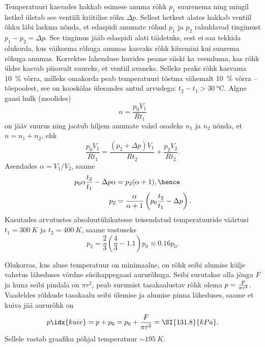 \documentclass[10pt]{article}
\begin{document}
{
\solu
Temperatuuri kasvades hakkab esimese anuma rõhk $p_1$ suurenema ning mingil hetkel ületab see ventiili kriitilise rõhu $\Delta p$. Sellest hetkest alates hakkab ventiil õhku läbi laskma nõnda, et edaspidi anumate rõhud $p_1$ ja $p_2$ rahuldavad tingimust $p_1 - p_2 = \Delta p$. See tingimus jääb edaspidi alati täidetuks, sest ei saa tekkida olukorda, kus väiksema rõhuga anumas kasvaks rõhk kiiremini kui suurema rõhuga anumas. Korrektse lahenduse huvides peame siiski ka veenduma, kas rõhk üldse kasvab piisavalt suureks, et ventiil avaneks. Selleks peaks rõhk kasvama \SI{10}{\%} võrra, milleks omakorda peab temperatuuri tõstma vähemalt \SI{10}{\%} võrra – tõepoolest, see on kooskõlas ülesandes antud arvudega: $t_2 - t_1 > \SI{30}{\degreeCelsius}$. Algne gaasi hulk (moolides)
\[
n=\frac{p_{0} V_{1}}{R t_{1}}
\]
on jääv suurus ning jaotub hiljem anumate vahel osadeks $n_1$ ja $n_2$ nõnda, et $n = n_1+ n_2$, ehk
\[
\frac{p_{0} V_{1}}{R t_{1}}=\frac{\left(p_{2}+\Delta p\right) V_{1}}{R t_{2}}+\frac{p_{2} V_{2}}{R t_{2}}.
\]
Asendades $\alpha = V_1/V_2$, saame
\begin{align*}
p_{0} \alpha \frac{t_{2}}{t_{1}}-\Delta p \alpha&=p_{2}(\alpha+1),\hence
\\
p_{2}&=\frac{\alpha}{\alpha+1}\left(p_{0} \frac{t_{2}}{t_{1}}-\Delta p\right).
\end{align*}
Kasutades arvutustes absoluutühikutesse teisendatud temperatuuride väärtusi $t_1= \SI{300}{K}$ ja $t_2= \SI{400}{K}$, saame vastuseks
\[
p_2=\frac 23 \left(\frac 43- \num{1,1}\right) p_0 \approx \num{0,16}p_0.
\]
\probend
\bigskip


\solu
Olukorras, kus aluse temperatuur on minimaalne, on rõhk seibi alumise külje vahetus läheduses võrdne
süsihappegaasi aururõhuga. Seibi surutakse alla jõuga $F$ ja kuna seibi
pindala on $\pi r^2$, peab surumist tasakaalustav rõhk olema $p={F\over \pi r^2}$.
Vaadeldes rõhkude tasakaalu seibi ülemise ja alumise pinna läheduses, saame et kuiva jää aururõhk on
\[
p\idx{kuiv} = p + p_0= p_0+{F\over \pi r^2} = \SI{131.8}{kPa}.
\]
Sellele vastab graafiku põhjal temperatuur $\sim \SI{195}{K}$.
\probend
\bigskip


}
\end{document}
